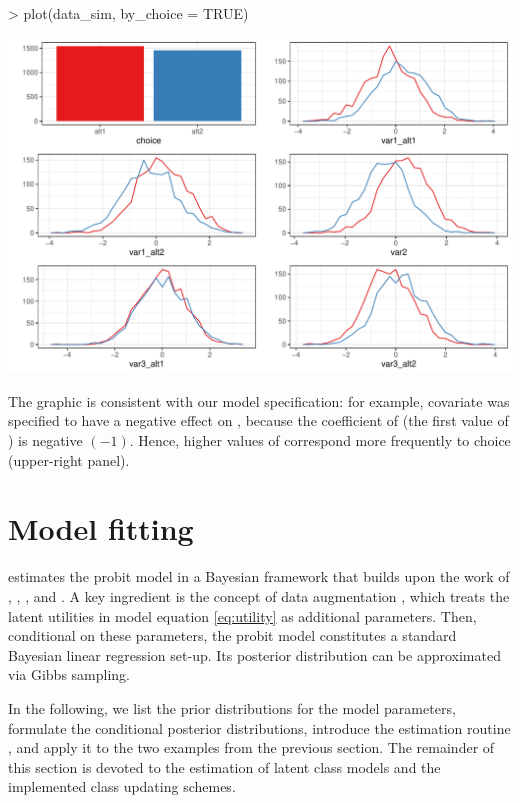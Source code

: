 \documentclass[article,shortnames]{jss}
\newcommand{\fct}[1]{\code{#1()}}
\begin{document}
\begin{Schunk}
\begin{Sinput}
> plot(data_sim, by_choice = TRUE)
\end{Sinput}
\end{Schunk}
\includegraphics{rprobitb_oelschlaeger_bauer-sim-data}

The graphic is consistent with our model specification: for example, covariate  was specified to have a negative effect on , because the coefficient of  (the first value of ) is negative $(-1)$. Hence, higher values of  correspond more frequently to choice  (upper-right panel).

\section{Model fitting} \label{sec:model_fitting}

 estimates the probit model in a Bayesian framework that builds upon the work of \cite{McCulloch:1994}, \cite{Nobile:1998}, \cite{Allenby:1998}, and \cite{Imai:2005}. A key ingredient is the concept of data augmentation \citep{Albert:1993}, which treats the latent utilities in model equation \eqref{eq:utility} as additional parameters. Then, conditional on these parameters, the probit model constitutes a standard Bayesian linear regression set-up. Its posterior distribution can be approximated via Gibbs sampling.

In the following, we list the prior distributions for the model parameters, formulate the conditional posterior distributions, introduce the estimation routine \fct{fit\_model}, and apply it to the two examples from the previous section. The remainder of this section is devoted to the estimation of latent class models and the implemented class updating schemes.
\end{document}

